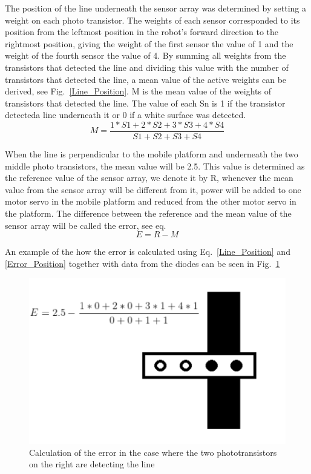 The position of the line underneath the sensor array was determined by setting a weight on each photo transistor. The weights of each sensor corresponded to its position from the leftmost position in the robot's forward direction to the rightmost position, giving the weight of the first sensor the value of 1 and the weight of the fourth sensor the value of 4. By summing all weights from the transistors that detected the line and dividing this value with the number of transistors that detected the line, a mean value of the active weights can be derived, see Fig.~\ref{Line_Position}. M is the mean value of the weights of transistors that detected the line. The value of each Sn is 1 if the transistor detecteda line underneath it or 0 if a white surface was detected.
\begin{equation}
    M=\frac{1*S1+2*S2+3*S3+4*S4}{S1+S2+S3+S4}
    \label{Line_Position}
\end{equation}

When the line is perpendicular to the mobile platform and underneath the two middle photo transistors, the mean value will be 2.5. This value is determined as the reference value of the sensor array, we denote it by R, whenever the mean value from the sensor array will be different from it, power will be added to one motor servo in the mobile platform and reduced from the other motor servo in the platform. The difference between the reference and the mean value of the sensor array will be called the error, see eq.
\begin{equation}
    E=R-M
    \label{Error_Position}
\end{equation}

An example of the how the error is calculated using Eq.~\eqref{Line_Position} and \eqref{Error_Position} together with data from the diodes can be seen in Fig.~\ref{Line_Error_ex}

\begin{figure}[h]
    \centering
    \includegraphics[width =\textwidth]{sections/assets/Line_Error_ex.PNG}
    \caption{Calculation of the error in the case where the two phototransistors on the right are detecting the line}
    \label{Line_Error_ex}
\end{figure}


